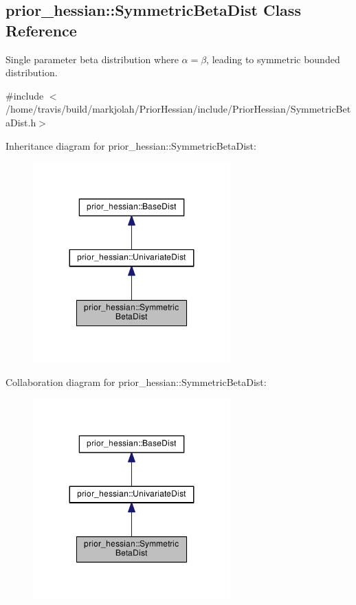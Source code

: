 \hypertarget{classprior__hessian_1_1SymmetricBetaDist}{}\subsection{prior\+\_\+hessian\+:\+:Symmetric\+Beta\+Dist Class Reference}
\label{classprior__hessian_1_1SymmetricBetaDist}


Single parameter beta distribution where $\alpha = \beta$, leading to symmetric bounded distribution.  




{\ttfamily \#include $<$/home/travis/build/markjolah/\+Prior\+Hessian/include/\+Prior\+Hessian/\+Symmetric\+Beta\+Dist.\+h$>$}



Inheritance diagram for prior\+\_\+hessian\+:\+:Symmetric\+Beta\+Dist\+:\nopagebreak
\begin{figure}[H]
\begin{center}
\leavevmode
\includegraphics[width=215pt]{classprior__hessian_1_1SymmetricBetaDist__inherit__graph}
\end{center}
\end{figure}


Collaboration diagram for prior\+\_\+hessian\+:\+:Symmetric\+Beta\+Dist\+:\nopagebreak
\begin{figure}[H]
\begin{center}
\leavevmode
\includegraphics[width=215pt]{classprior__hessian_1_1SymmetricBetaDist__coll__graph}
\end{center}
\end{figure}
